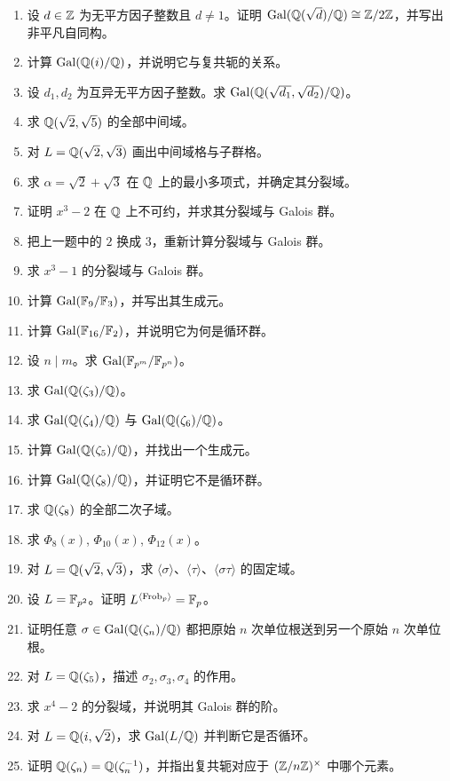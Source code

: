 \begin{enumerate}[label=\textbf{习题12.\arabic*.}, leftmargin=*, itemsep=0.75em]
\item \basic 设 $d\in\mathbb{Z}$ 为无平方因子整数且 $d\neq1$。证明 $\mathrm{Gal}(\mathbb{Q}(\sqrt d)/\mathbb{Q})\cong\mathbb{Z}/2\mathbb{Z}$，并写出非平凡自同构。
\item \basic 计算 $\mathrm{Gal}(\mathbb{Q}(i)/\mathbb{Q})$，并说明它与复共轭的关系。
\item \basic 设 $d_1,d_2$ 为互异无平方因子整数。求 $\mathrm{Gal}(\mathbb{Q}(\sqrt{d_1},\sqrt{d_2})/\mathbb{Q})$。
\item \basic 求 $\mathbb{Q}(\sqrt2,\sqrt5)$ 的全部中间域。
\item \basic 对 $L=\mathbb{Q}(\sqrt2,\sqrt3)$ 画出中间域格与子群格。
\item \basic 求 $\alpha=\sqrt2+\sqrt3$ 在 $\mathbb{Q}$ 上的最小多项式，并确定其分裂域。
\item \basic 证明 $x^3-2$ 在 $\mathbb{Q}$ 上不可约，并求其分裂域与 Galois 群。
\item \basic 把上一题中的 $2$ 换成 $3$，重新计算分裂域与 Galois 群。
\item \basic 求 $x^3-1$ 的分裂域与 Galois 群。
\item \basic 计算 $\mathrm{Gal}(\mathbb{F}_9/\mathbb{F}_3)$，并写出其生成元。
\item \basic 计算 $\mathrm{Gal}(\mathbb{F}_{16}/\mathbb{F}_2)$，并说明它为何是循环群。
\item \basic 设 $n\mid m$。求 $\mathrm{Gal}(\mathbb{F}_{p^m}/\mathbb{F}_{p^n})$。
\item \basic 求 $\mathrm{Gal}(\mathbb{Q}(\zeta_3)/\mathbb{Q})$。
\item \basic 求 $\mathrm{Gal}(\mathbb{Q}(\zeta_4)/\mathbb{Q})$ 与 $\mathrm{Gal}(\mathbb{Q}(\zeta_6)/\mathbb{Q})$。
\item \basic 计算 $\mathrm{Gal}(\mathbb{Q}(\zeta_5)/\mathbb{Q})$，并找出一个生成元。
\item \basic 计算 $\mathrm{Gal}(\mathbb{Q}(\zeta_8)/\mathbb{Q})$，并证明它不是循环群。
\item \basic 求 $\mathbb{Q}(\zeta_8)$ 的全部二次子域。
\item \basic 求 $\Phi_8(x)$, $\Phi_{10}(x)$, $\Phi_{12}(x)$。
\item \basic 对 $L=\mathbb{Q}(\sqrt2,\sqrt3)$，求 $\langle \sigma \rangle$、$\langle \tau \rangle$、$\langle \sigma\tau \rangle$ 的固定域。
\item \basic 设 $L=\mathbb{F}_{p^2}$。证明 $L^{\langle \mathrm{Frob}_p \rangle}=\mathbb{F}_p$。
\item \basic 证明任意 $\sigma\in\mathrm{Gal}(\mathbb{Q}(\zeta_n)/\mathbb{Q})$ 都把原始 $n$ 次单位根送到另一个原始 $n$ 次单位根。
\item \basic 对 $L=\mathbb{Q}(\zeta_5)$，描述 $\sigma_2, \sigma_3, \sigma_4$ 的作用。
\item \basic 求 $x^4-2$ 的分裂域，并说明其 Galois 群的阶。
\item \basic 对 $L=\mathbb{Q}(i,\sqrt2)$，求 $\mathrm{Gal}(L/\mathbb{Q})$ 并判断它是否循环。
\item \basic 证明 $\mathbb{Q}(\zeta_n)=\mathbb{Q}(\zeta_n^{-1})$，并指出复共轭对应于 $(\mathbb{Z}/n\mathbb{Z})^\times$ 中哪个元素。
\end{enumerate}

